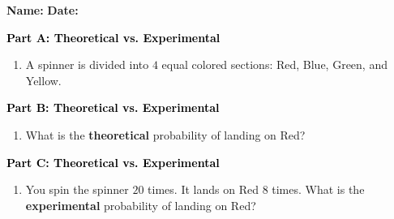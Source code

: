 \documentclass[12pt, letterpaper, fleqn]{article}
\newcommand{\blank}{\underline{\hspace{2.2cm}}}
\begin{document}
\textbf{Name:} \underline{\hspace{5cm}}
\hfill
\textbf{Date:} \underline{\hspace{3cm}}\\

\begin{tcolorbox}[colback=customteal!20]
\large\textcolor{black}{\textbf{Part A: Theoretical vs. Experimental}}
\end{tcolorbox}

\vspace{3mm}

\begin{enumerate}[itemsep=2.5cm, leftmargin=0.6cm]
\item A spinner is divided into $4$ equal colored sections: Red, Blue, Green, and Yellow.
\end{enumerate}

\newpage

\begin{tcolorbox}[colback=customteal!20]
\large\textcolor{black}{\textbf{Part B: Theoretical vs. Experimental}}
\end{tcolorbox}

\vspace{3mm}

\begin{enumerate}[itemsep=2.5cm, leftmargin=0.6cm, resume]
\item What is the \textbf{theoretical} probability of landing on Red? \blank
\end{enumerate}

\newpage

\begin{tcolorbox}[colback=customteal!20]
\large\textcolor{black}{\textbf{Part C: Theoretical vs. Experimental}}
\end{tcolorbox}

\vspace{3mm}

\begin{enumerate}[itemsep=2.5cm, leftmargin=0.6cm, resume]
\item You spin the spinner $20$ times. It lands on Red $8$ times. What is the \textbf{experimental} probability of landing on Red? \blank
\end{enumerate}

\newpage
\end{document}
